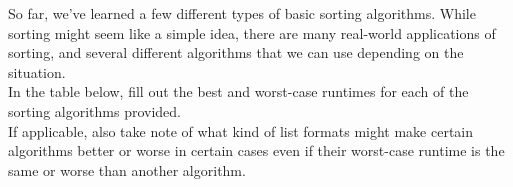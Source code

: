 \begin{blocksection}
So far, we've learned a few different types of basic sorting algorithms. While
sorting might seem like a simple idea, there are many real-world applications of
sorting, and several different algorithms that we can use depending on the situation.\\
In the table below, fill out the best and worst-case runtimes for each of the sorting algorithms provided.\\
If applicable, also take note of what kind of list formats might make certain algorithms better or worse in certain cases even if their worst-case runtime is the same or worse than another algorithm.
\end{blocksection}

